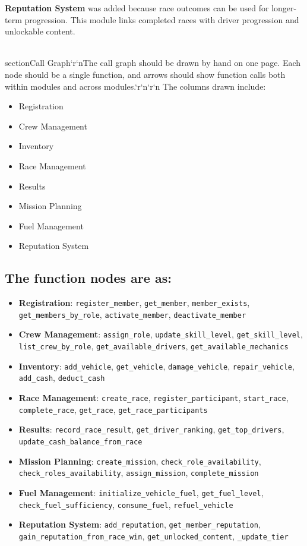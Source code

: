 \documentclass[12pt]{article}
\begin{document}
\textbf{Reputation System} was added because race outcomes can be used for longer-term progression. This module links completed races with driver progression and unlockable content.

\\section{Call Graph}`r`nThe call graph should be drawn by hand on one page. Each node should be a single function, and arrows should show function calls both within modules and across modules.`r`n`r`n
The columns drawn include:
\begin{itemize}
\item Registration
\item Crew Management
\item Inventory
\item Race Management
\item Results
\item Mission Planning
\item Fuel Management
\item Reputation System
\end{itemize}

\subsection{The function nodes are as:}
\begin{itemize}
\item \textbf{Registration}: \texttt{register\_member}, \texttt{get\_member}, \texttt{member\_exists}, \texttt{get\_members\_by\_role}, \texttt{activate\_member}, \texttt{deactivate\_member}
\item \textbf{Crew Management}: \texttt{assign\_role}, \texttt{update\_skill\_level}, \texttt{get\_skill\_level}, \texttt{list\_crew\_by\_role}, \texttt{get\_available\_drivers}, \texttt{get\_available\_mechanics}
\item \textbf{Inventory}: \texttt{add\_vehicle}, \texttt{get\_vehicle}, \texttt{damage\_vehicle}, \texttt{repair\_vehicle}, \texttt{add\_cash}, \texttt{deduct\_cash}
\item \textbf{Race Management}: \texttt{create\_race}, \texttt{register\_participant}, \texttt{start\_race}, \texttt{complete\_race}, \texttt{get\_race}, \texttt{get\_race\_participants}
\item \textbf{Results}: \texttt{record\_race\_result}, \texttt{get\_driver\_ranking}, \texttt{get\_top\_drivers}, \texttt{update\_cash\_balance\_from\_race}
\item \textbf{Mission Planning}: \texttt{create\_mission}, \texttt{check\_role\_availability}, \texttt{check\_roles\_availability}, \texttt{assign\_mission}, \texttt{complete\_mission}
\item \textbf{Fuel Management}: \texttt{initialize\_vehicle\_fuel}, \texttt{get\_fuel\_level}, \texttt{check\_fuel\_sufficiency}, \texttt{consume\_fuel}, \texttt{refuel\_vehicle}
\item \textbf{Reputation System}: \texttt{add\_reputation}, \texttt{get\_member\_reputation}, \texttt{gain\_reputation\_from\_race\_win}, \texttt{get\_unlocked\_content}, \texttt{\_update\_tier}
\end{itemize}
\end{document}
